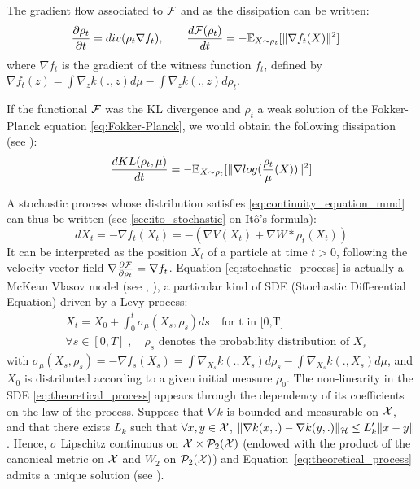 \begin{proposition}\label{prop:mmd_flow} The gradient flow associated to ${{\mathcal F}}$ and as the dissipation can be written:
\begin{equation}\label{eq:continuity_equation_mmd}
\frac{\partial \rho_t}{\partial t}= div(\rho_t  \nabla f_t) ,\quad  \quad \frac{d {{\mathcal F}}(\rho_t)}{dt}=-{{\mathbb E}}_{X \sim \rho_t}[\|\nabla f_t(X)\|^2]\quad
\end{equation}
 where $\nabla f_t$ is the gradient of the witness function $f_t$, defined by $\nabla f_t(z)= \int \nabla_{z}k(.,z) d\mu -  \int \nabla_{z}k(.,z) d\rho_t$. %
\end{proposition}
\begin{remark}
	If the functional ${{\mathcal F}}$ was the KL divergence and $\rho_t$ a weak solution of the Fokker-Planck equation \cref{eq:Fokker-Planck}, we would obtain the following dissipation (see \cite{wibisono2018sampling}):
	\begin{align}\label{eq:decreasing_mmd}
	\frac{d KL(\rho_t, \mu)}{dt}=-{{\mathbb E}}_{X \sim \rho_t}[\|\nabla log(\frac{\rho_t}{\mu}(X))\|^2]
	\end{align}
\end{remark}
A stochastic process whose distribution satisfies \cref{eq:continuity_equation_mmd} can thus be written (see \cref{sec:ito_stochastic} on Itô's formula):
\begin{equation}\label{eq:stochastic_process}
dX_t=-\nabla f_t(X_t) = - (\nabla V (X_t) + \nabla W * \rho_t(X_t))
\end{equation}
It can be interpreted as the position $X_t$ of a particle at time $t > 0$, following the velocity vector field $\nabla \frac{\partial{{{\mathcal F}}}}{\partial{\rho_t}}=\nabla f_t$.  Equation \eqref{eq:stochastic_process} is actually a McKean Vlasov model (see \cite{kac1956foundations}, \cite{mckean1966class}), a particular kind of SDE (Stochastic Differential Equation) driven by a Levy process:
\begin{align}\label{eq:theoretical_process}
&X_t=X_{0}+\int_{0}^t \sigma_{\mu}(X_s, \rho_s)ds \quad \text{for t in [0,T]}\\
&\forall s \in [0,T]\;,\quad \rho_s \text{ denotes the probability distribution of } X_s
\end{align}
with $\sigma_{\mu}(X_s, \rho_s)=-\nabla f_s(X_s)=\int \nabla_{X_s}k(.,X_s) d\rho_s -  \int \nabla_{X_s}k(.,X_s) d\mu$, and $X_0$ is distributed according to a given initial measure $\rho_0$. The non-linearity in the SDE \eqref{eq:theoretical_process} appears through the dependency of its coefficients on the law of the process. Suppose that $\nabla k$ is bounded and measurable on ${{\mathcal X}}$, and that there exists $L_k$ such that $\forall x,y \in {{\mathcal X}}$, $\|\nabla k(x,.)-\nabla k(y,.) \|_{{{\mathcal H}}}\le L'_k \|x-y\|$. Hence, $\sigma$  Lipschitz continuous on ${{\mathcal X}} \times \mathcal{P}_2({{\mathcal X}})$ (endowed with the product of the canonical metric on ${{\mathcal X}}$ and $W_2$ on $\mathcal{P}_2({{\mathcal X}})$) and Equation~\eqref{eq:theoretical_process} admits a unique solution (see \cite{jourdain2007nonlinear}).
